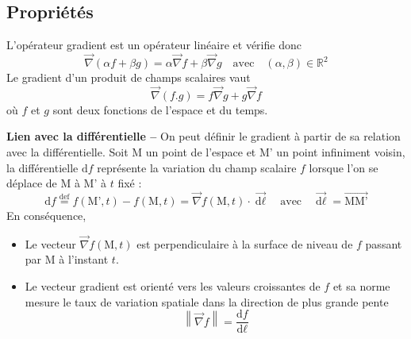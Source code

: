 \subsection{Propriétés}
L'opérateur gradient est un  opérateur linéaire et vérifie donc 
\[
	\overrightarrow{\nabla}(\alpha f+\beta g)=\alpha \overrightarrow{\nabla}f+\beta\overrightarrow{\nabla}g
	\quad\text{avec}\quad	(\alpha,\beta)\in\mathbb{R}^2
\]
Le gradient d'un produit de champs scalaires vaut 
\[
	\overrightarrow{\nabla}(f.g)=f\overrightarrow{\nabla}g+g\overrightarrow{\nabla}f	
\]
où $f$ et $g$ sont deux fonctions de l'espace et du temps.

\textbf{Lien avec la différentielle --} On peut définir le gradient à partir de sa relation avec la différentielle. Soit M un point de l'espace et M' un point infiniment voisin, la différentielle $\text{d}f$ représente la variation du champ scalaire $f$ lorsque l'on se déplace de M à M' à $t$ fixé : 
	\[
	\text{d}f\stackrel{\text{def}}= f(\text{M'},t)-f(\text{M},t)=\overrightarrow{\nabla}f(\text{M},t)\cdot\overrightarrow{\text{d}\ell}
	\quad\text{avec}\quad
	\overrightarrow{\text{d}\ell}=\overrightarrow{\text{MM'}}	
	\]
En conséquence,
\begin{itemize}
\item Le vecteur $\overrightarrow{\nabla}f(\text{M},t)$ est perpendiculaire à la surface de niveau de $f$ passant par M à l'instant $t$.
\item Le vecteur gradient est orienté vers les valeurs croissantes de $f$ et sa norme  mesure le taux de variation spatiale dans la direction de plus grande pente 
\[
	\left\| \overrightarrow{\nabla}f\right\| =\dfrac{\text{d}f}{\text{d}\ell}
\]
\end{itemize}




